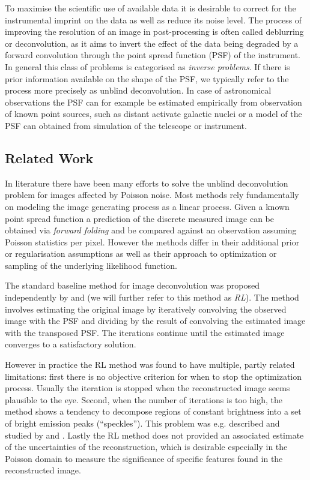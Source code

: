 \documentclass[twocolumn]{aastex631}
\begin{document}
    To maximise the scientific use of available data it is desirable to correct for the instrumental imprint on the data as well as reduce its noise level. The process of improving the resolution of an image in post-processing is often called deblurring or deconvolution, as it aims to invert the effect of the data being degraded by a forward convolution through the point spread function (PSF) of the instrument. In general this class of problems is categorised as \textit{inverse problems}. If there is prior information available on the shape of the PSF, we typically refer to the process more precisely as unblind deconvolution. In case of astronomical observations the PSF can for example be estimated empirically from observation of known point sources, such as distant activate galactic nuclei or a model of the PSF can obtained from simulation of the telescope or instrument.

    \subsection{Related Work}
    In literature there have been many efforts to solve the unblind deconvolution problem for images affected by Poisson noise. Most methods rely fundamentally on modeling the image generating process as a linear process. Given a known point spread function a prediction of the discrete measured image can be obtained via \textit{forward folding} and be compared against an observation assuming Poisson statistics per pixel. However the methods differ in their additional prior or regularisation assumptions as well as their approach to optimization or sampling of the underlying likelihood function.
    
    The standard baseline method for image deconvolution was proposed independently by \cite{Richardson1972} and \cite{Lucy1974} (we will further refer to this method as \textit{RL}). The method involves estimating the original image by iteratively convolving the observed image with the PSF and dividing by the result of convolving the estimated image with the transposed PSF. The iterations continue until the estimated image converges to a satisfactory solution. 

    However in practice the RL method was found to have multiple, partly related limitations: first there is no objective criterion for when to stop the optimization process. Usually the iteration is stopped when the reconstructed image seems plausible to the eye. Second, when the number of iterations is too high, the method shows a tendency to decompose regions of constant brightness into a set of bright emission peaks (\enquote{speckles}). This problem was e.g. described and studied by \cite{Reeves1995} and \cite{Fish1995}. Lastly the RL method does not provided an associated estimate of the uncertainties of the reconstruction, which is desirable especially in the Poisson domain to measure the significance of specific features found in the reconstructed image.
    
\end{document}
